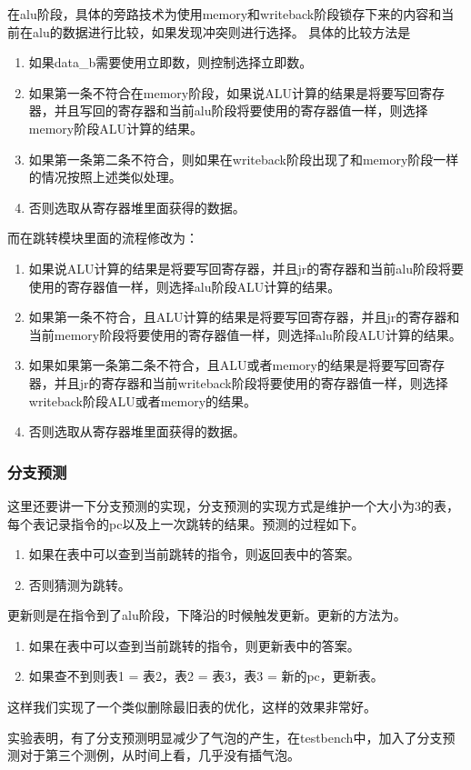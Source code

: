 在alu阶段，具体的旁路技术为使用memory和writeback阶段锁存下来的内容和当前在alu的数据进行比较，如果发现冲突则进行选择。
具体的比较方法是
\begin{enumerate}
        \item 如果data\_b需要使用立即数，则控制选择立即数。
        \item 如果第一条不符合在memory阶段，如果说ALU计算的结果是将要写回寄存器，并且写回的寄存器和当前alu阶段将要使用的寄存器值一样，则选择memory阶段ALU计算的结果。
        \item 如果第一条第二条不符合，则如果在writeback阶段出现了和memory阶段一样的情况按照上述类似处理。
        \item 否则选取从寄存器堆里面获得的数据。
\end{enumerate}
而在跳转模块里面的流程修改为：
\begin{enumerate}
        \item 如果说ALU计算的结果是将要写回寄存器，并且jr的寄存器和当前alu阶段将要使用的寄存器值一样，则选择alu阶段ALU计算的结果。
        \item 如果第一条不符合，且ALU计算的结果是将要写回寄存器，并且jr的寄存器和当前memory阶段将要使用的寄存器值一样，则选择alu阶段ALU计算的结果。
        \item 如果如果第一条第二条不符合，且ALU或者memory的结果是将要写回寄存器，并且jr的寄存器和当前writeback阶段将要使用的寄存器值一样，则选择writeback阶段ALU或者memory的结果。
        \item 否则选取从寄存器堆里面获得的数据。
\end{enumerate}

\subsubsection{分支预测}
这里还要讲一下分支预测的实现，分支预测的实现方式是维护一个大小为3的表，每个表记录指令的pc以及上一次跳转的结果。预测的过程如下。
\begin{enumerate}
        \item 如果在表中可以查到当前跳转的指令，则返回表中的答案。
        \item 否则猜测为跳转。
\end{enumerate}
更新则是在指令到了alu阶段，下降沿的时候触发更新。更新的方法为。
\begin{enumerate}
        \item 如果在表中可以查到当前跳转的指令，则更新表中的答案。
        \item 如果查不到则表1  =  表2，表2  =  表3，表3  =  新的pc，更新表。
\end{enumerate}
这样我们实现了一个类似删除最旧表的优化，这样的效果非常好。

实验表明，有了分支预测明显减少了气泡的产生，在testbench中，加入了分支预测对于第三个测例，从时间上看，几乎没有插气泡。

